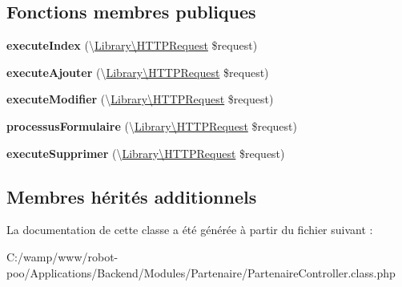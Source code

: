 \subsection*{Fonctions membres publiques}
\begin{DoxyCompactItemize}
\item 
\hypertarget{class_applications_1_1_backend_1_1_modules_1_1_partenaire_1_1_partenaire_controller_ac9c6fe801e9ac09e4a395ad64c76ed04}{{\bfseries execute\+Index} (\textbackslash{}\hyperlink{class_library_1_1_h_t_t_p_request}{Library\textbackslash{}\+H\+T\+T\+P\+Request} \$request)}\label{class_applications_1_1_backend_1_1_modules_1_1_partenaire_1_1_partenaire_controller_ac9c6fe801e9ac09e4a395ad64c76ed04}

\item 
\hypertarget{class_applications_1_1_backend_1_1_modules_1_1_partenaire_1_1_partenaire_controller_adf056b6997127e682bbd4ae668d0a247}{{\bfseries execute\+Ajouter} (\textbackslash{}\hyperlink{class_library_1_1_h_t_t_p_request}{Library\textbackslash{}\+H\+T\+T\+P\+Request} \$request)}\label{class_applications_1_1_backend_1_1_modules_1_1_partenaire_1_1_partenaire_controller_adf056b6997127e682bbd4ae668d0a247}

\item 
\hypertarget{class_applications_1_1_backend_1_1_modules_1_1_partenaire_1_1_partenaire_controller_ae86ff917aafe384e7fb46673719cba62}{{\bfseries execute\+Modifier} (\textbackslash{}\hyperlink{class_library_1_1_h_t_t_p_request}{Library\textbackslash{}\+H\+T\+T\+P\+Request} \$request)}\label{class_applications_1_1_backend_1_1_modules_1_1_partenaire_1_1_partenaire_controller_ae86ff917aafe384e7fb46673719cba62}

\item 
\hypertarget{class_applications_1_1_backend_1_1_modules_1_1_partenaire_1_1_partenaire_controller_a8e3be54836a0615d184b6e518218bda5}{{\bfseries processus\+Formulaire} (\textbackslash{}\hyperlink{class_library_1_1_h_t_t_p_request}{Library\textbackslash{}\+H\+T\+T\+P\+Request} \$request)}\label{class_applications_1_1_backend_1_1_modules_1_1_partenaire_1_1_partenaire_controller_a8e3be54836a0615d184b6e518218bda5}

\item 
\hypertarget{class_applications_1_1_backend_1_1_modules_1_1_partenaire_1_1_partenaire_controller_a6bb898240e821bbbb62bf86cb12a1bc2}{{\bfseries execute\+Supprimer} (\textbackslash{}\hyperlink{class_library_1_1_h_t_t_p_request}{Library\textbackslash{}\+H\+T\+T\+P\+Request} \$request)}\label{class_applications_1_1_backend_1_1_modules_1_1_partenaire_1_1_partenaire_controller_a6bb898240e821bbbb62bf86cb12a1bc2}

\end{DoxyCompactItemize}
\subsection*{Membres hérités additionnels}


La documentation de cette classe a été générée à partir du fichier suivant \+:\begin{DoxyCompactItemize}
\item 
C\+:/wamp/www/robot-\/poo/\+Applications/\+Backend/\+Modules/\+Partenaire/Partenaire\+Controller.\+class.\+php\end{DoxyCompactItemize}
